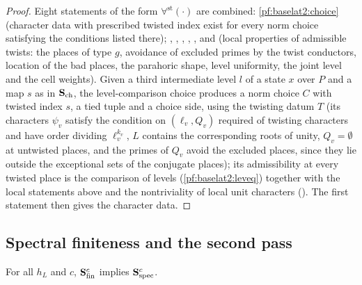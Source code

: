 \begin{proof}
Eight statements of the form $\forall^{\mathrm{st}}(\cdot)$ are combined: \cref{pf:baselat2:choice} (character data
with prescribed twisted index exist for every norm choice satisfying the conditions listed there);
, ,
,
,
, 
and  (local properties of admissible twists: the places
of type $g$, avoidance of excluded primes by the twist conductors, location of the bad places, the
parahoric shape, level uniformity, the joint level and the cell weights). Given a third intermediate level
$l$ of a state $x$ over $P$ and a map $s$ as in $\mathbf{S}_{\mathrm{ch}}$, the level-comparison choice
 produces a norm choice $C$ with twisted
index $s$, a tied tuple and a choice side, using the twisting datum $T$ (its characters $\psi_v$ satisfy
the condition on $(\ell_v,Q_v)$ required of twisting characters and have order dividing $\ell_v^{k_v}$, $L$
contains the corresponding roots of unity,
$Q_v=\emptyset$ at untwisted places, and the primes of $Q_v$ avoid the excluded places, since they lie outside the exceptional sets of the
conjugate places); its admissibility at every twisted place
is the comparison of levels (\cref{pf:baselat2:leveq}) together with the local statements above and the
nontriviality of local unit characters (). The
first statement then gives the character data.
\end{proof}

\subsection{Spectral finiteness and the second pass}\label{sec:pf:baselat2:second}

\begin{lemma}\label{pf:baselat2:sfinoalt}
For all $h_L$ and $c$, $\mathbf{S}_{\mathrm{fin}}^{c}$ implies $\mathbf{S}_{\mathrm{spec}}^{c}$.
\end{lemma}

